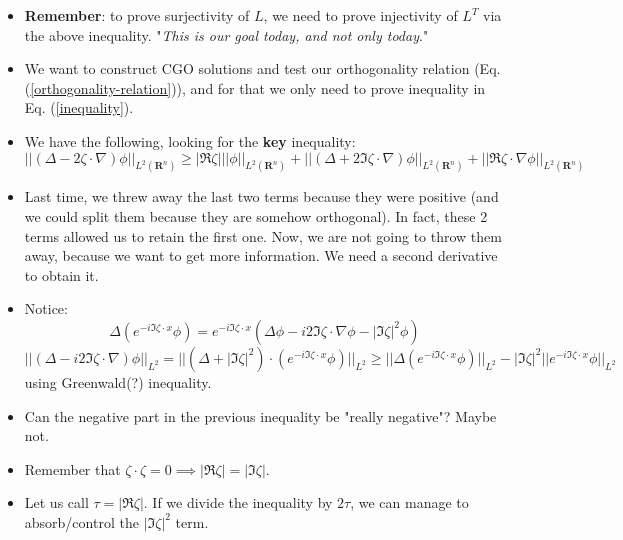\documentclass{article}
\begin{document}
\begin{itemize}
    \item \textbf{Remember}: to prove surjectivity of $L$, we need to prove injectivity of $L^T$ via the above inequality. "\textit{This is our goal today, and not only today}."

    \item We want to construct CGO solutions and test our orthogonality relation (Eq. (\ref{orthogonality-relation})), and for that we only need to prove inequality in Eq. (\ref{inequality}).

    \item We have the following, looking for the \textbf{key} inequality:
    \begin{equation}
        ||  (\Delta - 2\zeta \cdot \nabla) \phi ||_{L^2(\mathbf{R}^n)} \geq |\Re \zeta| || \phi ||_{L^2(\mathbf{R}^n)} + || (\Delta + 2 \Im \zeta \cdot \nabla) \phi ||_{L^2(\mathbf{R}^n)} + || \Re \zeta \cdot \nabla \phi||_{L^2(\mathbf{R}^n)}
    \end{equation}
    
    \item Last time, we threw away the last two terms because they were positive (and we could split them because they are somehow orthogonal). In fact, these 2 terms allowed us to retain the first one. Now, we are not going to throw them away, because we want to get more information. We need a second derivative to obtain it.

    \item Notice:
    \begin{equation}
        \Delta (e^{-i \Im  \zeta \cdot x} \phi) = e^{-i \Im  \zeta \cdot x} (\Delta \phi - i2 \Im \zeta \cdot \nabla \phi - |\Im \zeta|^2 \phi)
    \end{equation}
    \begin{equation}
        ||  (\Delta - i2 \Im \zeta \cdot \nabla) \phi ||_{L^2} = || (\Delta + |\Im \zeta|^2) \cdot (e^{-i \Im  \zeta \cdot x} \phi)||_{L^2} \geq || \Delta(e^{-i \Im  \zeta \cdot x} \phi)||_{L^2} - |\Im \zeta|^2 || e^{-i \Im  \zeta \cdot x} \phi ||_{L^2}
    \end{equation}
    using Greenwald(?) inequality.

    \item Can the negative part in the previous inequality be "really negative"? Maybe not.

    \item Remember that $\zeta \cdot \zeta = 0 \implies |\Re \zeta| = |\Im \zeta |$.

    \item Let us call $\tau = |\Re \zeta|$. If we divide the inequality by $2\tau$, we can manage to absorb/control the $|\Im \zeta|^2 $ term.


\end{itemize}
\end{document}
